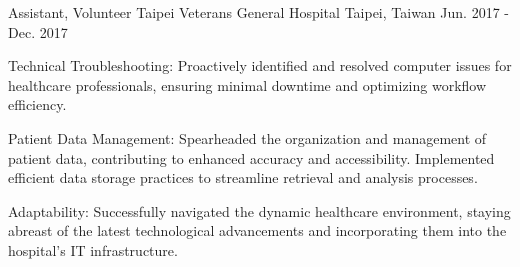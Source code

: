 

\begin{cventries}

  \cventry
    {Assistant, Volunteer} %
    {Taipei Veterans General Hospital} %
    {Taipei, Taiwan} %
    {Jun. 2017 - Dec. 2017} %
    {
      \begin{cvitems} %
        \item {Technical Troubleshooting: Proactively identified and resolved computer issues for healthcare professionals, ensuring minimal downtime and optimizing workflow efficiency.}
        \item {Patient Data Management: Spearheaded the organization and management of patient data, contributing to enhanced accuracy and accessibility. Implemented efficient data storage practices to streamline retrieval and analysis processes.}
        \item {Adaptability: Successfully navigated the dynamic healthcare environment, staying abreast of the latest technological advancements and incorporating them into the hospital’s IT infrastructure.}
      \end{cvitems}
    }


\end{cventries}
